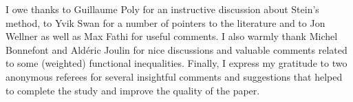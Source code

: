 \documentclass[11pt]{article}
\begin{document}
I owe thanks to Guillaume Poly for an instructive discussion about Stein's
method, to Yvik Swan for a number of pointers to the literature and to Jon
Wellner as well as Max Fathi for useful comments. I also warmly thank Michel
Bonnefont and Ald\'{e}ric Joulin for nice discussions and valuable comments
related to some (weighted) functional inequalities. Finally, I express my
gratitude to two anonymous referees for several insightful comments and
suggestions that helped to complete the study and improve the quality of the
paper.



\end{document}
